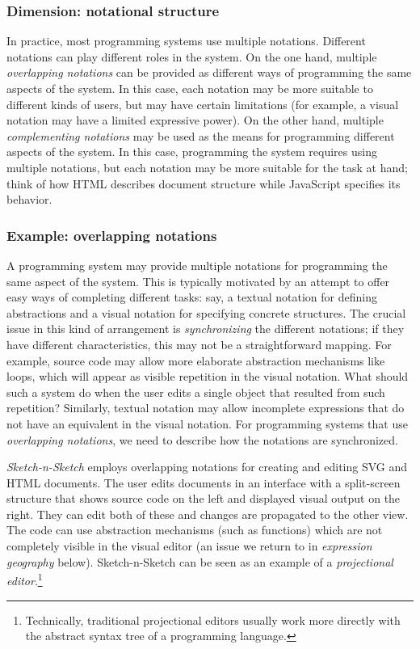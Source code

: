 \documentclass[english,submission]{programming}
\begin{document}
\hypertarget{dimension-notational-structure}{%
\subsubsection{Dimension: notational
structure}\label{dimension-notational-structure}}

In practice, most programming systems use multiple notations. Different
notations can play different roles in the system. On the one hand,
multiple \emph{overlapping notations} can be provided as different ways
of programming the same aspects of the system. In this case, each
notation may be more suitable to different kinds of users, but may have
certain limitations (for example, a visual notation may have a limited
expressive power). On the other hand, multiple \emph{complementing
notations} may be used as the means for programming different aspects of
the system. In this case, programming the system requires using multiple
notations, but each notation may be more suitable for the task at hand;
think of how HTML describes document structure while JavaScript
specifies its behavior.

\hypertarget{example-overlapping-notations}{%
\subsubsection{Example: overlapping
notations}\label{example-overlapping-notations}}

A programming system may provide multiple notations for programming the
same aspect of the system. This is typically motivated by an attempt to
offer easy ways of completing different tasks: say, a textual notation
for defining abstractions and a visual notation for specifying concrete
structures. The crucial issue in this kind of arrangement is
\emph{synchronizing} the different notations; if they have different
characteristics, this may not be a straightforward mapping. For example,
source code may allow more elaborate abstraction mechanisms like loops,
which will appear as visible repetition in the visual notation. What
should such a system do when the user edits a single object that
resulted from such repetition? Similarly, textual notation may allow
incomplete expressions that do not have an equivalent in the visual
notation. For programming systems that use \emph{overlapping notations},
we need to describe how the notations are synchronized.

\emph{Sketch-n-Sketch} \cite{SnS} employs overlapping notations for
creating and editing SVG and HTML documents. The user edits documents in
an interface with a split-screen structure that shows source code on the
left and displayed visual output on the right. They can edit both of
these and changes are propagated to the other view. The code can use
abstraction mechanisms (such as functions) which are not completely
visible in the visual editor (an issue we return to in \emph{expression
geography} below). Sketch-n-Sketch can be seen as an example of a
\emph{projectional editor}.\footnote{Technically, traditional
  projectional editors usually work more directly with the abstract
  syntax tree of a programming
  language.}
\end{document}
